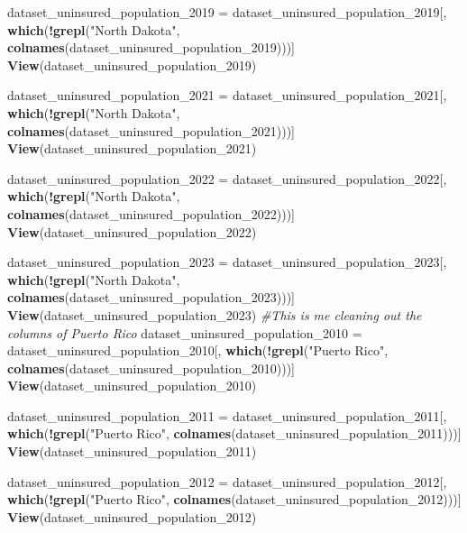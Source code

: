 \documentclass[
]{article}
\newenvironment{Shaded}{\begin{snugshade}}{\end{snugshade}}
\newcommand{\CommentTok}[1]{\textcolor[rgb]{0.56,0.35,0.01}{\textit{#1}}}
\newcommand{\FunctionTok}[1]{\textcolor[rgb]{0.13,0.29,0.53}{\textbf{#1}}}
\newcommand{\NormalTok}[1]{#1}
\newcommand{\OtherTok}[1]{\textcolor[rgb]{0.56,0.35,0.01}{#1}}
\newcommand{\SpecialCharTok}[1]{\textcolor[rgb]{0.81,0.36,0.00}{\textbf{#1}}}
\newcommand{\StringTok}[1]{\textcolor[rgb]{0.31,0.60,0.02}{#1}}
\begin{document}
\begin{Shaded}
\begin{Highlighting}[]
\NormalTok{dataset\_uninsured\_population\_2019 }\OtherTok{=}\NormalTok{ dataset\_uninsured\_population\_2019[, }\FunctionTok{which}\NormalTok{(}\SpecialCharTok{!}\FunctionTok{grepl}\NormalTok{(}\StringTok{"North Dakota"}\NormalTok{, }\FunctionTok{colnames}\NormalTok{(dataset\_uninsured\_population\_2019)))]}
\FunctionTok{View}\NormalTok{(dataset\_uninsured\_population\_2019)}

\NormalTok{dataset\_uninsured\_population\_2021 }\OtherTok{=}\NormalTok{ dataset\_uninsured\_population\_2021[, }\FunctionTok{which}\NormalTok{(}\SpecialCharTok{!}\FunctionTok{grepl}\NormalTok{(}\StringTok{"North Dakota"}\NormalTok{, }\FunctionTok{colnames}\NormalTok{(dataset\_uninsured\_population\_2021)))]}
\FunctionTok{View}\NormalTok{(dataset\_uninsured\_population\_2021)}

\NormalTok{dataset\_uninsured\_population\_2022 }\OtherTok{=}\NormalTok{ dataset\_uninsured\_population\_2022[, }\FunctionTok{which}\NormalTok{(}\SpecialCharTok{!}\FunctionTok{grepl}\NormalTok{(}\StringTok{"North Dakota"}\NormalTok{, }\FunctionTok{colnames}\NormalTok{(dataset\_uninsured\_population\_2022)))]}
\FunctionTok{View}\NormalTok{(dataset\_uninsured\_population\_2022)}

\NormalTok{dataset\_uninsured\_population\_2023 }\OtherTok{=}\NormalTok{ dataset\_uninsured\_population\_2023[, }\FunctionTok{which}\NormalTok{(}\SpecialCharTok{!}\FunctionTok{grepl}\NormalTok{(}\StringTok{"North Dakota"}\NormalTok{, }\FunctionTok{colnames}\NormalTok{(dataset\_uninsured\_population\_2023)))]}
\FunctionTok{View}\NormalTok{(dataset\_uninsured\_population\_2023)}
\CommentTok{\#This is me cleaning out the columns of Puerto Rico}
\NormalTok{dataset\_uninsured\_population\_2010 }\OtherTok{=}\NormalTok{ dataset\_uninsured\_population\_2010[, }\FunctionTok{which}\NormalTok{(}\SpecialCharTok{!}\FunctionTok{grepl}\NormalTok{(}\StringTok{"Puerto Rico"}\NormalTok{, }\FunctionTok{colnames}\NormalTok{(dataset\_uninsured\_population\_2010)))]}
\FunctionTok{View}\NormalTok{(dataset\_uninsured\_population\_2010)}

\NormalTok{dataset\_uninsured\_population\_2011 }\OtherTok{=}\NormalTok{ dataset\_uninsured\_population\_2011[, }\FunctionTok{which}\NormalTok{(}\SpecialCharTok{!}\FunctionTok{grepl}\NormalTok{(}\StringTok{"Puerto Rico"}\NormalTok{, }\FunctionTok{colnames}\NormalTok{(dataset\_uninsured\_population\_2011)))]}
\FunctionTok{View}\NormalTok{(dataset\_uninsured\_population\_2011)}

\NormalTok{dataset\_uninsured\_population\_2012 }\OtherTok{=}\NormalTok{ dataset\_uninsured\_population\_2012[, }\FunctionTok{which}\NormalTok{(}\SpecialCharTok{!}\FunctionTok{grepl}\NormalTok{(}\StringTok{"Puerto Rico"}\NormalTok{, }\FunctionTok{colnames}\NormalTok{(dataset\_uninsured\_population\_2012)))]}
\FunctionTok{View}\NormalTok{(dataset\_uninsured\_population\_2012)}


\end{Highlighting}
\end{Shaded}
\end{document}
